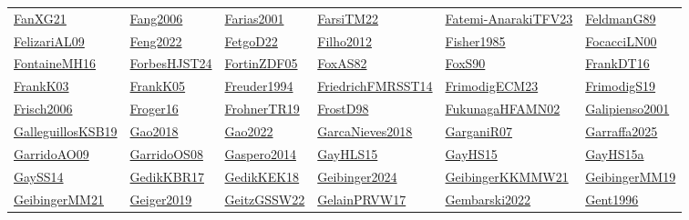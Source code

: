 \begin{longtable}{*{6}{l}}
\hyperref[detail:FanXG21]{FanXG21} & \hyperref[detail:Fang2006]{Fang2006} & \hyperref[detail:Farias2001]{Farias2001} & \hyperref[detail:FarsiTM22]{FarsiTM22} & \hyperref[detail:Fatemi-AnarakiTFV23]{Fatemi-AnarakiTFV23} & \hyperref[detail:FeldmanG89]{FeldmanG89}\\ 
\hyperref[detail:FelizariAL09]{FelizariAL09} & \hyperref[detail:Feng2022]{Feng2022} & \hyperref[detail:FetgoD22]{FetgoD22} & \hyperref[detail:Filho2012]{Filho2012} & \hyperref[detail:Fisher1985]{Fisher1985} & \hyperref[detail:FocacciLN00]{FocacciLN00}\\ 
\hyperref[detail:FontaineMH16]{FontaineMH16} & \hyperref[detail:ForbesHJST24]{ForbesHJST24} & \hyperref[detail:FortinZDF05]{FortinZDF05} & \hyperref[detail:FoxAS82]{FoxAS82} & \hyperref[detail:FoxS90]{FoxS90} & \hyperref[detail:FrankDT16]{FrankDT16}\\ 
\hyperref[detail:FrankK03]{FrankK03} & \hyperref[detail:FrankK05]{FrankK05} & \hyperref[detail:Freuder1994]{Freuder1994} & \hyperref[detail:FriedrichFMRSST14]{FriedrichFMRSST14} & \hyperref[detail:FrimodigECM23]{FrimodigECM23} & \hyperref[detail:FrimodigS19]{FrimodigS19}\\ 
\hyperref[detail:Frisch2006]{Frisch2006} & \hyperref[detail:Froger16]{Froger16} & \hyperref[detail:FrohnerTR19]{FrohnerTR19} & \hyperref[detail:FrostD98]{FrostD98} & \hyperref[detail:FukunagaHFAMN02]{FukunagaHFAMN02} & \hyperref[detail:Galipienso2001]{Galipienso2001}\\ 
\hyperref[detail:GalleguillosKSB19]{GalleguillosKSB19} & \hyperref[detail:Gao2018]{Gao2018} & \hyperref[detail:Gao2022]{Gao2022} & \hyperref[detail:GarcaNieves2018]{GarcaNieves2018} & \hyperref[detail:GarganiR07]{GarganiR07} & \hyperref[detail:Garraffa2025]{Garraffa2025}\\ 
\hyperref[detail:GarridoAO09]{GarridoAO09} & \hyperref[detail:GarridoOS08]{GarridoOS08} & \hyperref[detail:Gaspero2014]{Gaspero2014} & \hyperref[detail:GayHLS15]{GayHLS15} & \hyperref[detail:GayHS15]{GayHS15} & \hyperref[detail:GayHS15a]{GayHS15a}\\ 
\hyperref[detail:GaySS14]{GaySS14} & \hyperref[detail:GedikKBR17]{GedikKBR17} & \hyperref[detail:GedikKEK18]{GedikKEK18} & \hyperref[detail:Geibinger2024]{Geibinger2024} & \hyperref[detail:GeibingerKKMMW21]{GeibingerKKMMW21} & \hyperref[detail:GeibingerMM19]{GeibingerMM19}\\ 
\hyperref[detail:GeibingerMM21]{GeibingerMM21} & \hyperref[detail:Geiger2019]{Geiger2019} & \hyperref[detail:GeitzGSSW22]{GeitzGSSW22} & \hyperref[detail:GelainPRVW17]{GelainPRVW17} & \hyperref[detail:Gembarski2022]{Gembarski2022} & \hyperref[detail:Gent1996]{Gent1996}\\ 

\end{longtable}
